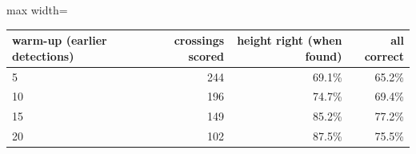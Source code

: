 \begin{adjustbox}{max width=\textwidth}
{\footnotesize
\begin{tabular}{lrrr}
\toprule
\textbf{warm-up (earlier detections)} & \textbf{crossings scored} & \textbf{height right (when found)} & \textbf{all correct} \\
\midrule
5 & 244 & 69.1\% & 65.2\% \\
10 & 196 & 74.7\% & 69.4\% \\
15 & 149 & 85.2\% & 77.2\% \\
20 & 102 & 87.5\% & 75.5\% \\
\bottomrule
\end{tabular}
}
\end{adjustbox}

